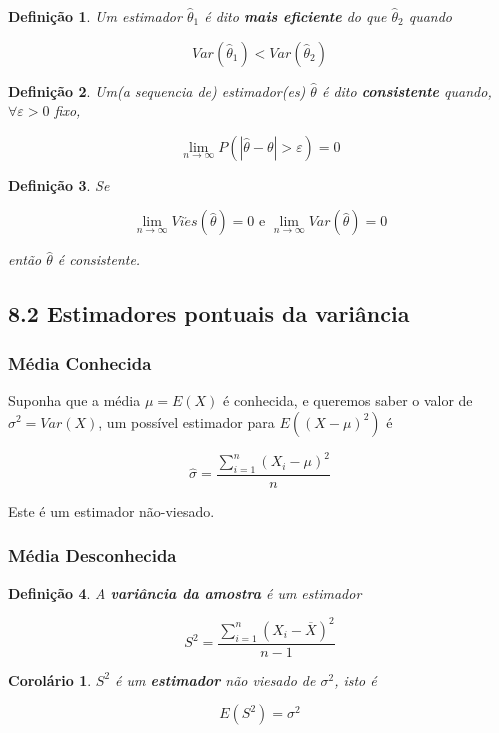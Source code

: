 \documentclass[12pt]{article}
\newtheorem{corollary}{Corolário}[theorem]
\newtheorem{definition}{Definição}
\begin{document}
\begin{definition}
    Um estimador $\hat{\theta}_1$ é dito \textbf{mais eficiente} do que $\hat{\theta}_2$ quando
    
    $$Var(\hat{\theta}_1) < Var(\hat{\theta}_2)$$
\end{definition}

\begin{definition}
    Um(a sequencia de) estimador(es) $\hat{\theta}$ é dito \textbf{consistente} quando, $\forall \varepsilon > 0$ fixo,
    
    $$\lim_{n \rightarrow \infty} P(|\hat{\theta} - \theta| > \varepsilon) = 0$$
\end{definition}

\begin{definition}
    Se 
    
    $$\lim_{n \rightarrow \infty} Vi\acute{e}s(\hat{\theta}) = 0 \text{ e } \lim_{n \rightarrow \infty} Var(\hat{\theta}) = 0$$
    
    então $\hat{\theta}$ é consistente.
\end{definition}

\subsection*{8.2 Estimadores pontuais da variância}
\label{s37}

\subsubsection*{Média Conhecida}
Suponha que a média $\mu = E(X)$ é conhecida, e queremos saber o valor de $\sigma^2 = Var(X)$, um possível estimador para $E((X - \mu)^2)$ é

$$\hat{\sigma} = \frac{\sum_{i = 1}^{n} (X_i - \mu)^2}{n}$$

Este é um estimador não-viesado.

\subsubsection*{Média Desconhecida}
\begin{definition}
    A \textbf{variância da amostra} é um estimador
    
    $$S^2 = \frac{\sum_{i = 1}^n (X_i - \overline{X})^2}{n - 1}$$
\end{definition}

\begin{corollary}
    $S^2$ é um \textbf{estimador} não viesado de $\sigma^2$, isto é
    
    $$E(S^2) = \sigma^2$$
\end{corollary}
\end{document}
